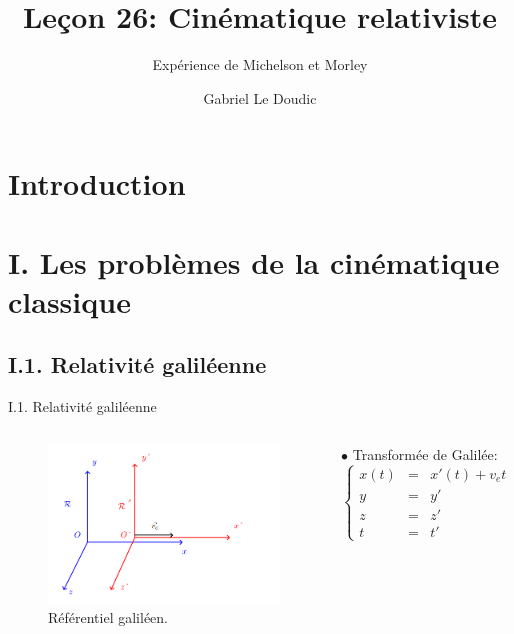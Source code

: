 \documentclass{beamer}
\title{Leçon 26: Cinématique relativiste}
\subtitle{Expérience de Michelson et Morley}
\author{Gabriel Le Doudic}
\institute{Préparation à l'agrégation de Rennes 1}
\begin{document}
\maketitle
\section{Introduction}


\section{I. Les problèmes de la cinématique classique}
\subsection{I.1. Relativité galiléenne}
\begin{frame}{I.1. Relativité galiléenne}
    \begin{columns}
    \begin{block}{}
\begin{figure}
    \centering
    \includegraphics[width=1\textwidth]{refgalileen.png}
    \caption{Référentiel galiléen.}
\end{figure}
\end{block}
$\bullet$ Transformée de Galilée:
\begin{equation}
    \left\{\begin{array} {rcl}
        x(t) &=& x'(t) + v_e t\\
        y &=& y'\\
        z &=& z'\\
        t &=& t'\nonumber
    \end{array}\right.
\end{equation}
\end{columns}
\end{frame}
\end{document}
